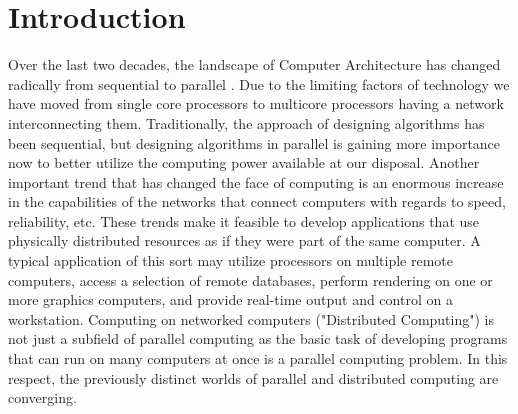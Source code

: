 \chapter{Introduction}\label{chapter:introduction}
Over the last two decades, the landscape of Computer Architecture has changed radically from sequential to parallel . Due to the limiting factors of technology we have moved from single core processors to multicore processors having a network interconnecting them. Traditionally, the approach of designing algorithms has been sequential, but designing algorithms in parallel is gaining more importance now to better utilize the computing power available at our disposal. Another important trend that has changed the face of computing is an enormous increase in the capabilities of the networks that connect computers with regards to speed, reliability, etc. These trends make it feasible to develop applications that use physically distributed resources as if they were part of the same computer. A typical application of this sort may utilize processors on multiple remote computers, access a selection of remote databases, perform rendering on one or more graphics computers, and provide real-time output and control on a workstation. Computing on networked computers ("Distributed Computing") is not just a subfield of parallel computing as the basic task of developing programs that can run on many computers at once is a parallel computing problem. In this respect, the previously distinct worlds of parallel and distributed computing are converging.\\ \par
\noindent
